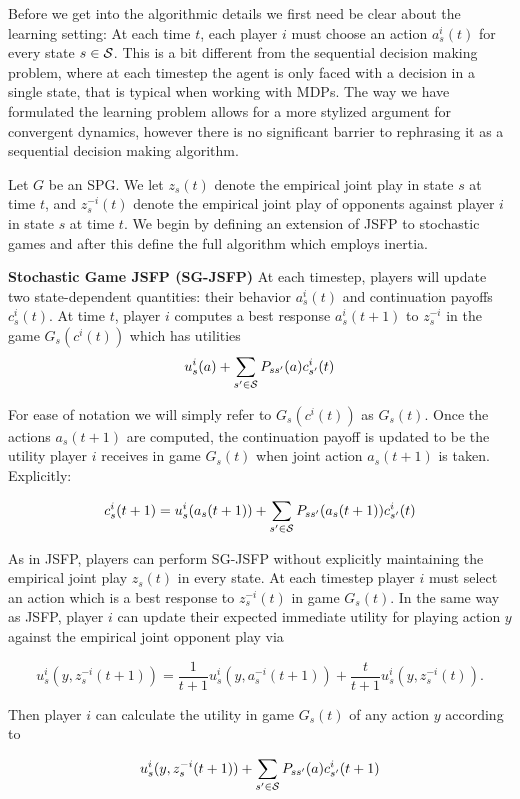 Before we get into the algorithmic details we first need be clear about the learning setting: At each time $t$, each player $i$ must choose an action $a^i_s(t)$ for every state $s \in \mathcal{S}$. This is a bit different from the sequential decision making problem, where at each timestep the agent is only faced with a decision in a single state, that is typical when working with MDPs. The way we have formulated the learning problem allows for a more stylized argument for convergent dynamics, however there is no significant barrier to rephrasing it as a sequential decision making algorithm. 


Let $G$ be an SPG. We let $z_s(t)$ denote the empirical joint play in state $s$ at time $t$, and $z^{-i}_s(t)$ denote the empirical joint play of opponents against player $i$ in state $s$ at time $t$. We begin by defining an extension of JSFP to stochastic games and after this define the full algorithm which employs inertia.

{\bf Stochastic Game JSFP (SG-JSFP)} At each timestep, players will update two state-dependent quantities: their behavior $a^i_s(t)$ and continuation payoffs $c^i_s(t)$. At time $t$, player $i$ computes a best response $a^i_s(t+1)$ to $z_s^{-i}$ in the game  $G_s(c^i(t))$ which has utilities
$$
u^i_s(a) + \sum_{s' \in \mathcal{S}} P_{ss'}(a) c^i_{s'}(t)
$$

For ease of notation we will simply refer to $G_s(c^i(t))$ as $G_s(t)$. Once the actions $a_s(t+1)$ are computed, the continuation payoff is updated to be the utility player $i$ receives in game $G_s(t)$ when joint action $a_s(t+1)$ is taken. Explicitly:

$$
c^i_s(t+1) = u^i_s(a_s(t+1)) + \sum_{s' \in \mathcal{S}} P_{ss'}(a_s(t+1)) c^i_{s'}(t)
$$


As in JSFP, players can perform SG-JSFP without explicitly maintaining the empirical joint play $z_s(t)$ in every state. At each timestep player $i$ must select an action which is a best response to $z^{-i}_s(t)$ in game $G_s(t)$. In the same way as JSFP, player $i$ can update their expected immediate utility for playing action $y$ against the empirical joint opponent play via

$$
u^i_s(y, z^{-i}_s(t+1)) = \frac{1}{t+1} u^i_s(y, a^{-i}_s(t+1)) + \frac{t}{t+1}u^i_s(y, z^{-i}_s(t)).
$$

Then player $i$ can calculate the utility in game $G_s(t)$ of any action $y$ according to

$$
u^i_s(y, z^{-i}_s(t+1)) + \sum_{s' \in \mathcal{S}} P_{ss'}(a) c^i_{s'}(t+1)
$$

